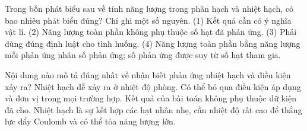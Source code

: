 \begin{ex}
Trong bốn phát biểu sau về tính năng lượng trong phân hạch và nhiệt hạch, có bao nhiêu phát biểu đúng? Chỉ ghi một số nguyên. (1) Kết quả cần có ý nghĩa vật lí. (2) Năng lượng toàn phần không phụ thuộc số hạt đã phản ứng. (3) Phải dùng đúng định luật cho tình huống. (4) Năng lượng toàn phần bằng năng lượng mỗi phản ứng nhân số phản ứng; số phản ứng được suy từ số hạt tham gia.
\end{ex}

\begin{ex}
Nội dung nào mô tả đúng nhất về nhận biết phản ứng nhiệt hạch và điều kiện xảy ra?
\choice
{Nhiệt hạch dễ xảy ra ở nhiệt độ phòng.}
{Có thể bỏ qua điều kiện áp dụng và đơn vị trong mọi trường hợp.}
{Kết quả của bài toán không phụ thuộc dữ kiện đã cho.}
{\True Nhiệt hạch là sự kết hợp các hạt nhân nhẹ, cần nhiệt độ rất cao để thắng lực đẩy Coulomb và có thể tỏa năng lượng lớn.}
\end{ex}


